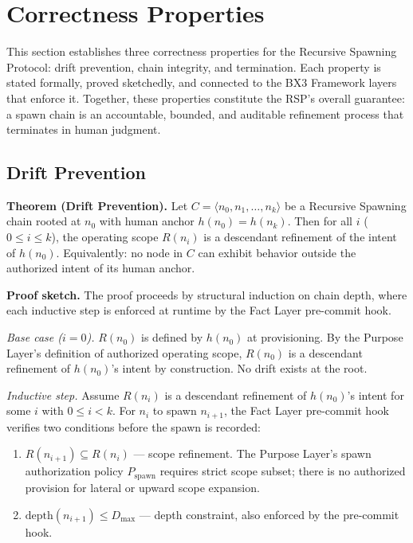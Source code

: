 \section{Correctness Properties}
\label{sec:rs-correctness}

This section establishes three correctness properties for the Recursive Spawning Protocol: drift prevention, chain integrity, and termination. Each property is stated formally, proved sketchedly, and connected to the BX3 Framework layers that enforce it. Together, these properties constitute the RSP's overall guarantee: a spawn chain is an accountable, bounded, and auditable refinement process that terminates in human judgment.

\subsection{Drift Prevention}
\label{sec:rs-drift-prevention}

\medskip
\noindent\textbf{Theorem (Drift Prevention).} Let $C = \langle n_0, n_1, \ldots, n_k \rangle$ be a Recursive Spawning chain rooted at $n_0$ with human anchor $h(n_0) = h(n_k)$. Then for all $i$ ($0 \leq i \leq k$), the operating scope $R(n_i)$ is a descendant refinement of the intent of $h(n_0)$. Equivalently: no node in $C$ can exhibit behavior outside the authorized intent of its human anchor.

\medskip
\noindent\textbf{Proof sketch.} The proof proceeds by structural induction on chain depth, where each inductive step is enforced at runtime by the Fact Layer pre-commit hook.

\medskip
\textit{Base case ($i=0$).} $R(n_0)$ is defined by $h(n_0)$ at provisioning. By the Purpose Layer's definition of authorized operating scope, $R(n_0)$ is a descendant refinement of $h(n_0)$'s intent by construction. No drift exists at the root.

\medskip
\textit{Inductive step.} Assume $R(n_i)$ is a descendant refinement of $h(n_0)$'s intent for some $i$ with $0 \leq i < k$. For $n_i$ to spawn $n_{i+1}$, the Fact Layer pre-commit hook verifies two conditions before the spawn is recorded:

\begin{enumerate}
    \item[(a)] $R(n_{i+1}) \subseteq R(n_i)$ — scope refinement. The Purpose Layer's spawn authorization policy $P_{\mathrm{spawn}}$ requires strict scope subset; there is no authorized provision for lateral or upward scope expansion.
    \item[(b)] $\mathrm{depth}(n_{i+1}) \leq D_{\mathrm{max}}$ — depth constraint, also enforced by the pre-commit hook.
\end{enumerate}

